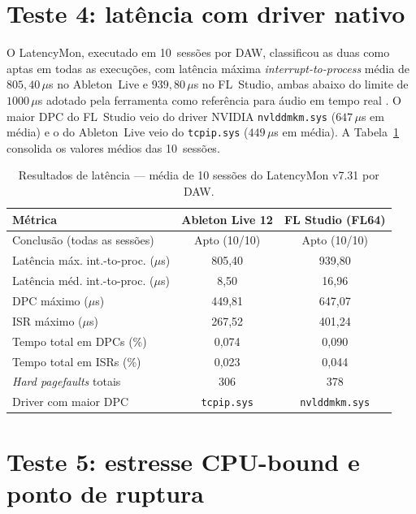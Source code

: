 \documentclass[tcc1]{classe_uftex/uftex}
\begin{document}
\section{Teste 4: latência com driver nativo}

O LatencyMon, executado em 10~sessões por DAW, classificou as duas
como aptas em todas as execuções, com latência máxima
\textit{interrupt-to-process} média de $805{,}40\,\mu$s no Ableton~Live
e $939{,}80\,\mu$s no FL~Studio, ambas abaixo do limite de $1000\,\mu$s
adotado pela ferramenta como referência para áudio em tempo real
\cite{asio4all}. O maior DPC do FL~Studio veio do driver NVIDIA
\texttt{nvlddmkm.sys} ($647\,\mu$s em média) e o do Ableton~Live veio
do \texttt{tcpip.sys} ($449\,\mu$s em média). A
Tabela~\ref{tab:t4} consolida os valores médios das 10~sessões.

\begin{table}[ht]
\centering
\small
\caption{\small Resultados de latência --- média de 10 sessões do
LatencyMon v7.31 por DAW.}
\label{tab:t4}
\begin{tabular}{lcc}
\toprule
\textbf{Métrica} & \textbf{Ableton Live 12} & \textbf{FL Studio (FL64)} \\
\midrule
Conclusão (todas as sessões)         & Apto (10/10)       & Apto (10/10)       \\
Latência máx. int.-to-proc. ($\mu$s) & 805{,}40           & 939{,}80           \\
Latência méd. int.-to-proc. ($\mu$s) &   8{,}50           &  16{,}96           \\
DPC máximo ($\mu$s)                  & 449{,}81           & 647{,}07           \\
ISR máximo ($\mu$s)                  & 267{,}52           & 401{,}24           \\
Tempo total em DPCs (\%)             & 0{,}074            & 0{,}090            \\
Tempo total em ISRs (\%)             & 0{,}023            & 0{,}044            \\
\textit{Hard pagefaults} totais      & 306                & 378                \\
Driver com maior DPC                 & \texttt{tcpip.sys} & \texttt{nvlddmkm.sys} \\
\bottomrule
\end{tabular}
\end{table}

\section{Teste 5: estresse CPU-bound e ponto de ruptura}
\end{document}
